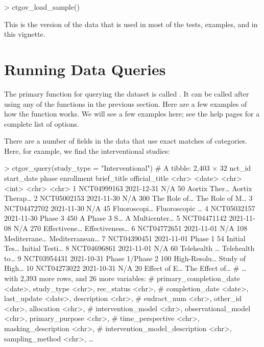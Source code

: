 \begin{example}
> ctgov_load_sample()
\end{example}

This is the version of the data that is used in most of the tests, examples,
and in this vignette.

\section{Running Data Queries}

The primary function for querying the dataset is called . It can
be called after using any of the functions in the previous section. Here
are a few examples of how the function works. We will see a few examples here;
see the help pages for a complete list of options.

There are a number of fields in the data that use exact matches of categories.
Here, for example, we find the interventional studies:

\begin{example}
> ctgov_query(study_type = "Interventional")
# A tibble: 2,403 × 32
   nct_id      start_date phase           enrollment brief_title  official_title
   <chr>       <date>     <chr>                <int> <chr>        <chr>
 1 NCT04999163 2021-12-31 N/A                     50 Aortix Ther… Aortix Therap…
 2 NCT05002153 2021-11-30 N/A                    300 The Role of… The Role of M…
 3 NCT04472702 2021-11-30 N/A                     45 Fluoroscopi… Fluoroscopic …
 4 NCT05032157 2021-11-30 Phase 3                450 A Phase 3 S… A Multicenter…
 5 NCT04471142 2021-11-08 N/A                    270 Effectivene… Effectiveness…
 6 NCT04772651 2021-11-01 N/A                    108 Mediterrane… Mediterranean…
 7 NCT04390451 2021-11-01 Phase 1                 54 Initial Tes… Initial Testi…
 8 NCT04696861 2021-11-01 N/A                     60 Telehealth … Telehealth to…
 9 NCT03954431 2021-10-31 Phase 1/Phase 2        100 High-Resolu… Study of High…
10 NCT04273022 2021-10-31 N/A                     20 Effect of E… The Effect of…
# … with 2,393 more rows, and 26 more variables:
#   primary_completion_date <date>, study_type <chr>, rec_status <chr>,
#   completion_date <date>, last_update <date>, description <chr>,
#   eudract_num <chr>, other_id <chr>, allocation <chr>,
#   intervention_model <chr>, observational_model <chr>, primary_purpose <chr>,
#   time_perspective <chr>, masking_description <chr>,
#   intervention_model_description <chr>, sampling_method <chr>, …
\end{example}

